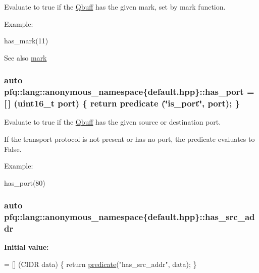 Evaluate to {\ttfamily true} if the \hyperlink{structpfq_1_1lang_1_1Qbuff}{Qbuff} has the given {\ttfamily mark}, set by mark function. 

Example\+:

has\+\_\+mark(11)

\begin{DoxySeeAlso}{See also}
\hyperlink{namespacepfq_1_1lang_1_1anonymous__namespace_02default_8hpp_03_a7b831baeabda070b89ca862a9445a4a8}{mark} 
\end{DoxySeeAlso}
\subsubsection[{\texorpdfstring{has\+\_\+port}{has_port}}]{\setlength{\rightskip}{0pt plus 5cm}auto pfq\+::lang\+::anonymous\+\_\+namespace\{default.\+hpp\}\+::has\+\_\+port = \mbox{[}$\,$\mbox{]} (uint16\+\_\+t {\bf port}) \{ return {\bf predicate} (\char`\"{}is\+\_\+port\char`\"{}, port); \}}\hypertarget{namespacepfq_1_1lang_1_1anonymous__namespace_02default_8hpp_03_a9f7161b8dfb842c5a845f413eb6bc82f}{}\label{namespacepfq_1_1lang_1_1anonymous__namespace_02default_8hpp_03_a9f7161b8dfb842c5a845f413eb6bc82f}


Evaluate to {\ttfamily true} if the \hyperlink{structpfq_1_1lang_1_1Qbuff}{Qbuff} has the given source or destination port. 

If the transport protocol is not present or has no port, the predicate evaluates to False.

Example\+:

has\+\_\+port(80) 
\subsubsection[{\texorpdfstring{has\+\_\+src\+\_\+addr}{has_src_addr}}]{\setlength{\rightskip}{0pt plus 5cm}auto pfq\+::lang\+::anonymous\+\_\+namespace\{default.\+hpp\}\+::has\+\_\+src\+\_\+addr}\hypertarget{namespacepfq_1_1lang_1_1anonymous__namespace_02default_8hpp_03_acb03dd3e34d6dd7e83d621fa9077194c}{}\label{namespacepfq_1_1lang_1_1anonymous__namespace_02default_8hpp_03_acb03dd3e34d6dd7e83d621fa9077194c}
{\bfseries Initial value\+:}
\begin{DoxyCode}
= [] (CIDR data)
        \{
            \textcolor{keywordflow}{return} \hyperlink{namespacepfq_1_1lang_aca9adafc436b7f851621b979fa1aaf88}{predicate}(\textcolor{stringliteral}{"has\_src\_addr"}, data);
        \}
\end{DoxyCode}


